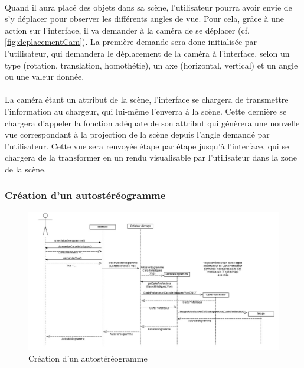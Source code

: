 \paragraph{}
Quand il aura placé des objets dans sa scène, l’utilisateur pourra avoir envie de s’y déplacer pour observer les différents angles de vue. Pour cela, grâce à une action sur l’interface, il va demander à la caméra de se déplacer (cf. \ref{fig:deplacementCam}). La première demande sera donc initialisée par l’utilisateur, qui demandera le déplacement de la caméra à l’interface, selon un type (rotation, translation, homothétie), un axe (horizontal, vertical) et un angle ou une valeur donnée.

\paragraph{}
La caméra étant un attribut de la scène, l’interface se chargera de transmettre l’information au chargeur, qui lui-même l’enverra à la scène. Cette dernière se chargera d'appeler la fonction adéquate de son attribut qui génèrera une nouvelle vue correspondant à la projection de la scène depuis l’angle demandé par l’utilisateur. Cette vue sera renvoyée étape par étape jusqu’à l’interface, qui se chargera de la transformer en un rendu visualisable par l’utilisateur dans la zone de la scène.

\subsubsection{Création d'un autostéréogramme}

\begin{figure}[h]
		\centering
		\includegraphics[scale=0.40]{creerstereogramme.jpg}
		\caption{\label{fig:creerAutostereogramme} Création d'un autostéréogramme}
\end{figure}

